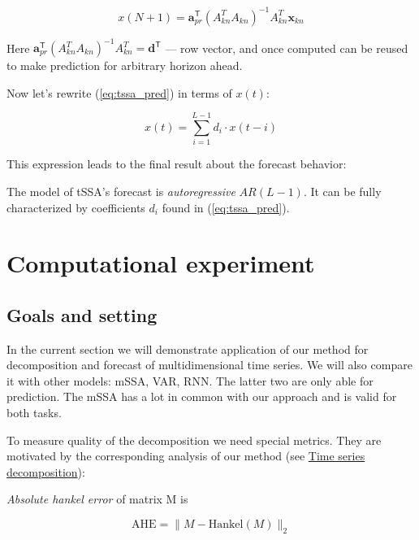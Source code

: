 	\begin{equation}\label{eq:tssa_pred}
		x(N + 1) = \mathbf{a}_{pr}^{\mathsf{T}} (A_{kn}^T A_{kn})^{-1} A_{kn}^T \mathbf{x}_{kn}
	\end{equation}
	
	Here $ \mathbf{a}_{pr}^{\mathsf{T}} (A_{kn}^T A_{kn})^{-1} A_{kn}^T = \mathbf{d}^{\mathsf{T}} $ --- row vector, and once computed can be reused to make prediction for arbitrary horizon ahead.
	
	Now let's rewrite (\ref{eq:tssa_pred}) in terms of $ x(t) $:
	
	\begin{equation*}\label{eq:autoregr}
		x(t) = \sum\limits_{i = 1}^{L - 1} d_i \cdot x(t - i)
	\end{equation*}
	
	This expression leads to the final result about the forecast behavior:
	
	\begin{Th}		
		The model of tSSA's forecast is \emph{autoregressive} $ AR(L - 1) $. It can be fully characterized by coefficients $ d_i $ found in (\ref{eq:tssa_pred}).
	\end{Th}
	
	\section{Computational experiment}	
	
	\subsection*{Goals and setting}
	
	In the current section we will demonstrate application of our method for decomposition and forecast of multidimensional time series. We will also compare it with other models: mSSA, VAR, RNN. The latter two are only able for prediction. The mSSA has a lot in common with our approach and is valid for both tasks.
	
	To measure quality of the decomposition we need special metrics. They are motivated by the corresponding analysis of our method (see \hyperref[sec:decomposition]{Time series decomposition}):
	
	\begin{Def}
		\emph{Absolute hankel error} of matrix M is 
		
		\[
		\text{AHE} = \lVert M - \text{Hankel}(M) \rVert_2
		\] 
		
	\end{Def}	
	
